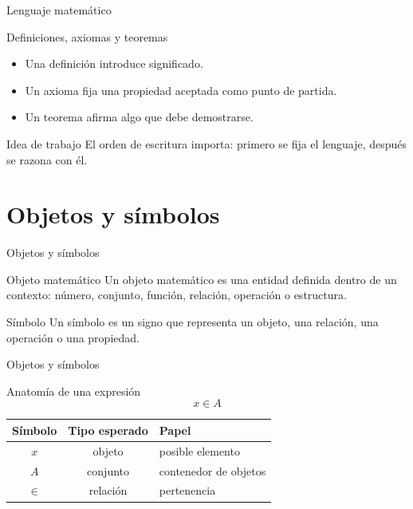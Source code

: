 \documentclass[aspectratio=169,11pt]{beamer}
\begin{document}
\begin{frame}{Lenguaje matemático}
\begin{block}{Definiciones, axiomas y teoremas}
\begin{itemize}
  \item Una definición introduce significado.
  \item Un axioma fija una propiedad aceptada como punto de partida.
  \item Un teorema afirma algo que debe demostrarse.
\end{itemize}
\end{block}

\begin{alertblock}{Idea de trabajo}
El orden de escritura importa: primero se fija el lenguaje, después se razona con él.
\end{alertblock}
\end{frame}

\section{Objetos y símbolos}

\begin{frame}{Objetos y símbolos}
\begin{block}{Objeto matemático}
Un objeto matemático es una entidad definida dentro de un contexto: número,
conjunto, función, relación, operación o estructura.
\end{block}

\begin{block}{Símbolo}
Un símbolo es un signo que representa un objeto, una relación, una operación o una propiedad.
\end{block}
\end{frame}

\begin{frame}{Objetos y símbolos}
\begin{block}{Anatomía de una expresión}
\[
  x\in A
\]
\begin{center}
\begin{tabular}{ccl}
\toprule
Símbolo & Tipo esperado & Papel \\
\midrule
\(x\) & objeto & posible elemento \\
\(A\) & conjunto & contenedor de objetos \\
\(\in\) & relación & pertenencia \\
\bottomrule
\end{tabular}
\end{center}
\end{block}
\end{frame}
\end{document}
